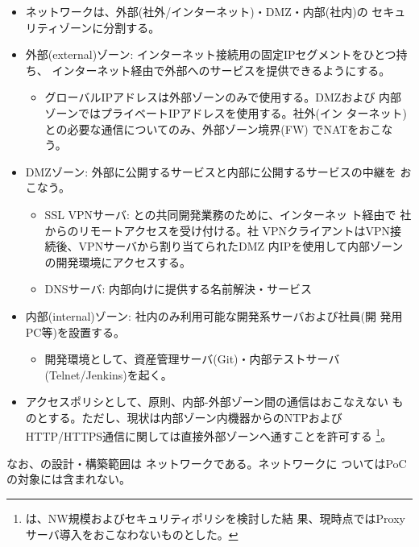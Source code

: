 \begin{itemize}
 \item \yo ネットワークは、外部(社外/インターネット)・DMZ・内部(社内)の
       セキュリティゾーンに分割する。
 \item 外部(external)ゾーン: インターネット接続用の固定IPセグメントをひとつ持ち、
       インターネット経由で外部へのサービスを提供できるようにする。
       \begin{itemize}
        \item グローバルIPアドレスは外部ゾーンのみで使用する。DMZおよび
              内部ゾーンではプライベートIPアドレスを使用する。社外(イン
              ターネット)との必要な通信についてのみ、外部ゾーン境界(FW)
              でNATをおこなう。
       \end{itemize}
 \item DMZゾーン: 外部に公開するサービスと内部に公開するサービスの中継を
       おこなう。
       \begin{itemize}
        \item SSL VPNサーバ: \tj との共同開発業務のために、インターネッ
              ト経由で \tj 社からのリモートアクセスを受け付ける。\tj 社
              VPNクライアントはVPN接続後、VPNサーバから割り当てられたDMZ
              内IPを使用して内部ゾーンの開発環境にアクセスする。
        \item DNSサーバ: \yo 内部向けに提供する名前解決・サービス
       \end{itemize}
 \item 内部(internal)ゾーン: 社内のみ利用可能な開発系サーバおよび社員(開
       発用PC等)を設置する。
       \begin{itemize}
        \item 開発環境として、資産管理サーバ(Git)・内部テストサーバ
              (Telnet/Jenkins)を起く。
       \end{itemize}
 \item アクセスポリシとして、原則、内部-外部ゾーン間の通信はおこなえない
       ものとする。ただし、現状は内部ゾーン内機器からのNTPおよび
       HTTP/HTTPS通信に関しては直接外部ゾーンへ通すことを許可する
       \footnote{\tj は、\yo NW規模およびセキュリティポリシを検討した結
       果、現時点ではProxyサーバ導入をおこなわないものとした。}。
\end{itemize}

なお、\tj の設計・構築範囲は \yo ネットワークである。\tj ネットワークに
ついてはPoCの対象には含まれない。

